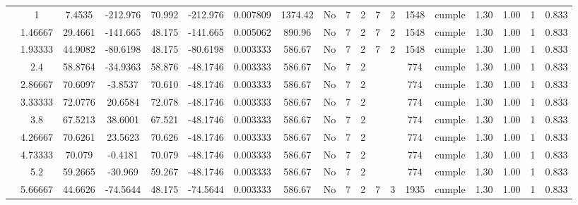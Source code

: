 \begin{table}[H]
{\begin{tabular}{|c|c|c|c|c|c|r|c|c|c|c|c|c|c|c|c|c|c|c|}
\cline{2-19}    & \cellcolor[rgb]{ .851,  .882,  .949}1 & 7.4535 & -212.976 & 70.992 & -212.976 & 0.007809 & 1374.42 & No  & 7   & 2   & 7   & 2   & 1548 & \cellcolor[rgb]{ .776,  .937,  .808}cumple & 1.30 & 1.00 & 1   & 0.833 \bigstrut\\
\cline{2-19}    & 1.46667 & 29.4661 & -141.665 & 48.175 & -141.665 & 0.005062 & 890.96 & No  & 7   & 2   & 7   & 2   & 1548 & \cellcolor[rgb]{ .776,  .937,  .808}cumple & 1.30 & 1.00 & 1   & 0.833 \bigstrut\\
\cline{2-19}    & 1.93333 & 44.9082 & -80.6198 & 48.175 & -80.6198 & 0.003333 & 586.67 & No  & 7   & 2   & 7   & 2   & 1548 & \cellcolor[rgb]{ .776,  .937,  .808}cumple & 1.30 & 1.00 & 1   & 0.833 \bigstrut\\
\cline{2-19}    & 2.4 & 58.8764 & -34.9363 & 58.876 & -48.1746 & 0.003333 & 586.67 & No  & 7   & 2   &     &     & 774 & \cellcolor[rgb]{ .776,  .937,  .808}cumple & 1.30 & 1.00 & 1   & 0.833 \bigstrut\\
\cline{2-19}    & 2.86667 & 70.6097 & -3.8537 & 70.610 & -48.1746 & 0.003333 & 586.67 & No  & 7   & 2   &     &     & 774 & \cellcolor[rgb]{ .776,  .937,  .808}cumple & 1.30 & 1.00 & 1   & 0.833 \bigstrut\\
\cline{2-19}    & 3.33333 & 72.0776 & 20.6584 & 72.078 & -48.1746 & 0.003333 & 586.67 & No  & 7   & 2   &     &     & 774 & \cellcolor[rgb]{ .776,  .937,  .808}cumple & 1.30 & 1.00 & 1   & 0.833 \bigstrut\\
\cline{2-19}    & 3.8 & 67.5213 & 38.6001 & 67.521 & -48.1746 & 0.003333 & 586.67 & No  & 7   & 2   &     &     & 774 & \cellcolor[rgb]{ .776,  .937,  .808}cumple & 1.30 & 1.00 & 1   & 0.833 \bigstrut\\
\cline{2-19}    & 4.26667 & 70.6261 & 23.5623 & 70.626 & -48.1746 & 0.003333 & 586.67 & No  & 7   & 2   &     &     & 774 & \cellcolor[rgb]{ .776,  .937,  .808}cumple & 1.30 & 1.00 & 1   & 0.833 \bigstrut\\
\cline{2-19}    & 4.73333 & 70.079 & -0.4181 & 70.079 & -48.1746 & 0.003333 & 586.67 & No  & 7   & 2   &     &     & 774 & \cellcolor[rgb]{ .776,  .937,  .808}cumple & 1.30 & 1.00 & 1   & 0.833 \bigstrut\\
\cline{2-19}    & 5.2 & 59.2665 & -30.969 & 59.267 & -48.1746 & 0.003333 & 586.67 & No  & 7   & 2   &     &     & 774 & \cellcolor[rgb]{ .776,  .937,  .808}cumple & 1.30 & 1.00 & 1   & 0.833 \bigstrut\\
\cline{2-19}    & 5.66667 & 44.6626 & -74.5644 & 48.175 & -74.5644 & 0.003333 & 586.67 & No  & 7   & 2   & 7   & 3   & 1935 & \cellcolor[rgb]{ .776,  .937,  .808}cumple & 1.30 & 1.00 & 1   & 0.833 \bigstrut\\

\end{tabular}}
\end{table}
